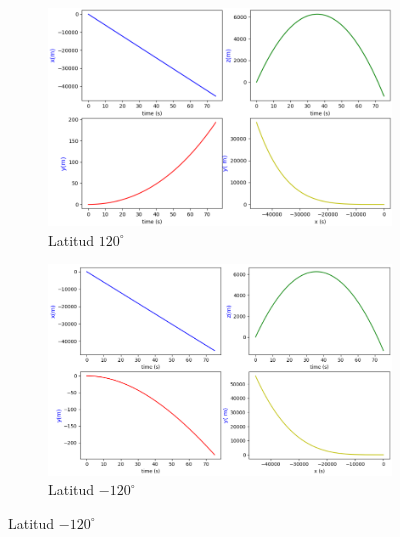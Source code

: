 \documentclass[11pt]{article}
\begin{document}
\begin{figure}[h]
                \begin{subfigure}[t]{.475\textwidth}
                    \centering\includegraphics[width=\textwidth]{fotos/gráficas/120.png}
                    \caption{Latitud $120^\circ$}
                \end{subfigure}
                \begin{subfigure}[t]{.495\textwidth}
                    \centering\includegraphics[width=\textwidth]{fotos/gráficas/-120.png}
                    \caption{Latitud $-120^\circ$}
                \end{subfigure}
            \end{figure}
\end{document}
